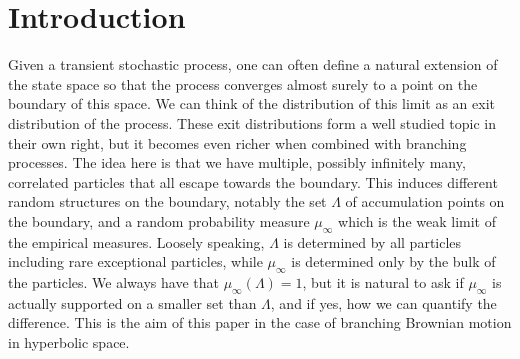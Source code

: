 \documentclass{article}
\theoremstyle{definition}
\numberwithin{equation}{section}
\numberwithin{thm}{section}
\begin{document}





\section{Introduction}

Given a transient stochastic process, one can often define a natural extension of the state space so that the process converges almost surely to a point on the boundary of this space. We can think of the distribution of this limit as an exit distribution of the process. These exit distributions {form} a well studied topic in {their own right}, but it becomes even richer when combined with branching processes. The idea here is that we have multiple, possibly infinitely many, correlated particles that all escape towards the boundary. This induces different random structures on the boundary, notably the set $\Lambda$ of accumulation points on the boundary, and a random probability measure $\mu_\infty$ which is the weak limit of the empirical measures.
Loosely speaking, $\Lambda$ is determined by all particles including rare exceptional particles, while $\mu_\infty$ is determined only by the bulk of the particles. We always have that $\mu_\infty(\Lambda)=1$, but it is natural to ask if $\mu_\infty$ is actually supported on a smaller set than $\Lambda$, and if yes, how we can quantify the difference. This is the aim of this paper in the case of branching Brownian motion in hyperbolic space. 
\end{document}

